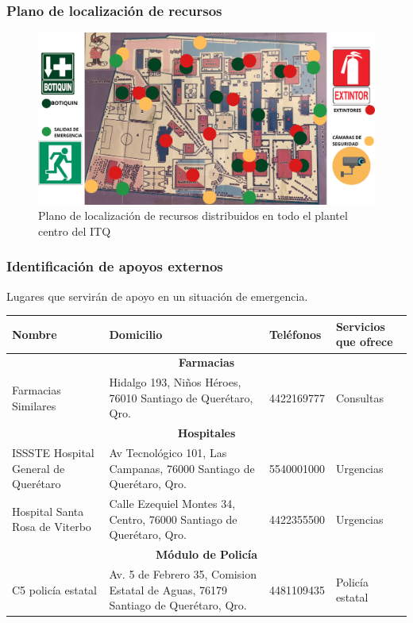     \subsubsection{Plano de localización de recursos}
    \begin{figure}[H]
        \centering
        \includegraphics[scale=0.21]{34/img/planoRecursos.png}
        \caption{Plano de localización de recursos distribuidos en todo el plantel centro del ITQ}
        \label{fig:enter-plano}
    \end{figure}
    
    \centering
    \subsubsection{ Identificación de apoyos externos}
    
    Lugares que servirán de apoyo en un situación de emergencia.
    
    \begin{tabular}{|p{5em}|p{6em}|p{5em}|p{4em}|}
             \hline
             \textbf{Nombre}& \textbf{Domicilio}& \textbf{Teléfonos}& \textbf{Servicios que ofrece}\\
            \hline
        \multicolumn{4}{c}{\textbf{Farmacias}}\\
        \hline
             Farmacias Similares &Hidalgo 193, Niños Héroes, 76010 Santiago de Querétaro, Qro.& 4422169777& Consultas\\
             \hline
             \multicolumn{4}{c}{\textbf{Hospitales}}\\
        \hline
              ISSSTE Hospital General de Querétaro& Av Tecnológico 101, Las Campanas, 76000 Santiago de Querétaro, Qro.&5540001000&Urgencias\\
              \hline
              Hospital Santa Rosa de Viterbo& Calle Ezequiel Montes 34, Centro, 76000 Santiago de Querétaro, Qro.& 4422355500&Urgencias\\
              \hline
             \multicolumn{4}{c}{\textbf{Módulo de Policía}}\\
        \hline
             C5 policía estatal&Av. 5 de Febrero 35, Comision Estatal de Aguas, 76179 Santiago de Querétaro, Qro.& 4481109435&Policía estatal\\         
              \hline
         \end{tabular}
    
